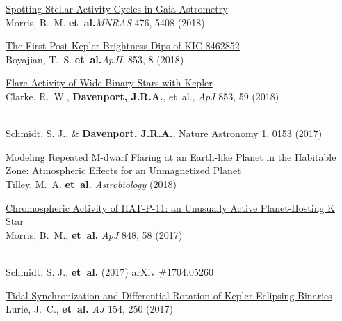 \documentclass{article}
\begin{document}
\begin{llist}
\begin{etaremune}[leftmargin=10pt]
\item{\sc \href{https://arxiv.org/abs/1802.09943}{\color{NavyBlue}Spotting Stellar Activity Cycles in Gaia Astrometry}}\\
Morris, B.~M. {\bf et~al.}{\em MNRAS} 476, 5408 (2018)


\item{\sc \href{https://arxiv.org/abs/1801.00732}{\color{NavyBlue}The First Post-Kepler Brightness Dips of KIC 8462852}}\\
Boyajian, T.~S. {\bf et~al.}{\em ApJL} 853, 8 (2018)


\item{\sc \href{https://arxiv.org/abs/1712.04570}{\color{NavyBlue}Flare Activity of Wide Binary Stars with Kepler}}\\
Clarke, R.~W., {\bf Davenport, J.R.A.}, et~al., {\em ApJ} 853, 59 (2018)


\item\href{https://www.nature.com/articles/s41550-017-0153}{\color{NavyBlue}{\sc Who asks questions at astronomy meetings?}}\\ 
Schmidt, S. J., \& {\bf Davenport, J.R.A.}, Nature Astronomy 1, 0153 (2017)

\item{\sc \href{https://arxiv.org/abs/1711.08484}{\color{NavyBlue} Modeling Repeated M-dwarf Flaring at an Earth-like Planet in the Habitable Zone: Atmospheric Effects for an Unmagnetized Planet}}\\
Tilley, M.~A. {\bf et~al.} {\em Astrobiology} (2018)

\item{\sc \href{https://arxiv.org/abs/1709.03913}{\color{NavyBlue} Chromospheric Activity of HAT-P-11: an Unusually Active Planet-Hosting K Star}}\\
Morris, B.~M., {\bf et~al.} {\em ApJ} 848, 58 (2017)

\item\href{https://arxiv.org/abs/1704.05260}{\color{NavyBlue}{\sc The Role of Gender in Asking Questions at Cool Stars 18 and 19}}\\ 
Schmidt, S. J., {\bf et~al.} (2017) arXiv \#1704.05260

\item{\sc \href{https://arxiv.org/abs/1710.07339}{\color{NavyBlue}Tidal Synchronization and Differential Rotation of Kepler Eclipsing Binaries}}\\ Lurie, J.~C., {\bf et~al.} {\em AJ} 154, 250 (2017)


\end{etaremune}
\end{llist}
\end{document}
